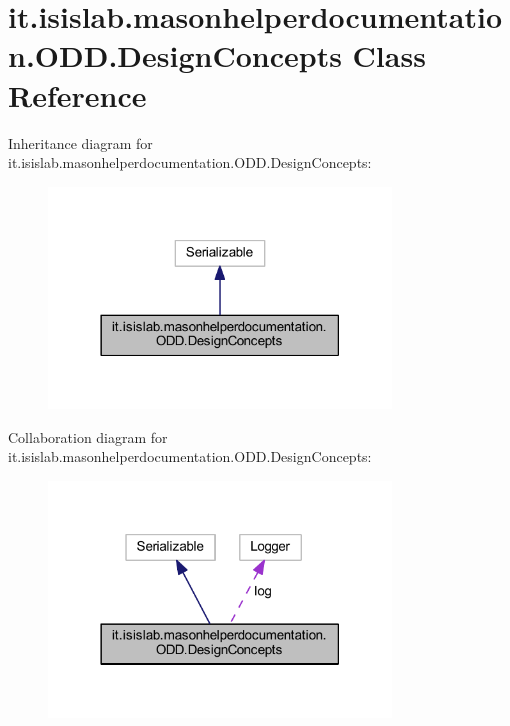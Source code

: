 \hypertarget{classit_1_1isislab_1_1masonhelperdocumentation_1_1_o_d_d_1_1_design_concepts}{\section{it.\-isislab.\-masonhelperdocumentation.\-O\-D\-D.\-Design\-Concepts Class Reference}
\label{classit_1_1isislab_1_1masonhelperdocumentation_1_1_o_d_d_1_1_design_concepts}
}


Inheritance diagram for it.\-isislab.\-masonhelperdocumentation.\-O\-D\-D.\-Design\-Concepts\-:
\nopagebreak
\begin{figure}[H]
\begin{center}
\leavevmode
\includegraphics[width=258pt]{classit_1_1isislab_1_1masonhelperdocumentation_1_1_o_d_d_1_1_design_concepts__inherit__graph}
\end{center}
\end{figure}


Collaboration diagram for it.\-isislab.\-masonhelperdocumentation.\-O\-D\-D.\-Design\-Concepts\-:
\nopagebreak
\begin{figure}[H]
\begin{center}
\leavevmode
\includegraphics[width=258pt]{classit_1_1isislab_1_1masonhelperdocumentation_1_1_o_d_d_1_1_design_concepts__coll__graph}
\end{center}
\end{figure}
